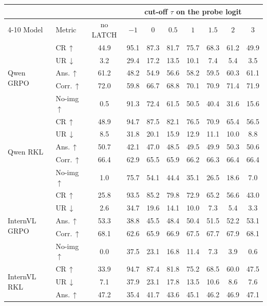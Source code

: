 \begin{table}[t]
\centering\small
\setlength{\tabcolsep}{4pt}
\begin{tabular}{llcccccccc}
\toprule
& & & \multicolumn{7}{c}{cut-off $\tau$ on the probe logit} \\ \cmidrule(lr){4-10}
Model & Metric & no LATCH & $-1$ & $0$ & $0.5$ & $1$ & $1.5$ & $2$ & $3$ \\
\midrule
\multirow{5}{*}{Qwen GRPO} & CR\,$\uparrow$ & 44.9 & 95.1 & 87.3 & 81.7 & 75.7 & 68.3 & 61.2 & 49.9 \\
 & UR\,$\downarrow$ & 3.2 & 29.4 & 17.2 & 13.5 & 10.1 & 7.4 & 5.4 & 3.5 \\
 & Ans.\,$\uparrow$ & 61.2 & 48.2 & 54.9 & 56.6 & 58.2 & 59.5 & 60.3 & 61.1 \\
 & Corr.\,$\uparrow$ & 72.0 & 59.8 & 66.7 & 68.8 & 70.1 & 70.9 & 71.4 & 71.9 \\
 & No-img\,$\uparrow$ & 0.5 & 91.3 & 72.4 & 61.5 & 50.5 & 40.4 & 31.6 & 15.6 \\
\midrule
\multirow{5}{*}{Qwen RKL} & CR\,$\uparrow$ & 48.9 & 94.7 & 87.5 & 82.1 & 76.5 & 70.9 & 65.4 & 56.5 \\
 & UR\,$\downarrow$ & 8.5 & 31.8 & 20.1 & 15.9 & 12.9 & 11.1 & 10.0 & 8.8 \\
 & Ans.\,$\uparrow$ & 50.7 & 42.1 & 47.0 & 48.5 & 49.5 & 49.9 & 50.3 & 50.6 \\
 & Corr.\,$\uparrow$ & 66.4 & 62.9 & 65.5 & 65.9 & 66.2 & 66.3 & 66.4 & 66.4 \\
 & No-img\,$\uparrow$ & 1.0 & 75.7 & 54.1 & 44.4 & 35.1 & 26.5 & 18.6 & 7.0 \\
\midrule
\multirow{5}{*}{InternVL GRPO} & CR\,$\uparrow$ & 25.8 & 93.5 & 85.2 & 79.8 & 72.9 & 65.2 & 56.6 & 43.0 \\
 & UR\,$\downarrow$ & 2.6 & 34.7 & 19.6 & 14.1 & 10.0 & 7.3 & 5.4 & 3.3 \\
 & Ans.\,$\uparrow$ & 53.3 & 38.8 & 45.5 & 48.4 & 50.4 & 51.5 & 52.2 & 53.1 \\
 & Corr.\,$\uparrow$ & 68.1 & 62.6 & 65.9 & 66.9 & 67.5 & 67.7 & 67.9 & 68.1 \\
 & No-img\,$\uparrow$ & 0.0 & 37.5 & 23.1 & 16.8 & 11.4 & 7.3 & 3.9 & 0.6 \\
\midrule
\multirow{5}{*}{InternVL RKL} & CR\,$\uparrow$ & 33.9 & 94.7 & 87.4 & 81.8 & 75.2 & 68.5 & 60.0 & 47.5 \\
 & UR\,$\downarrow$ & 7.1 & 37.9 & 23.1 & 17.8 & 13.5 & 10.6 & 8.6 & 7.6 \\
 & Ans.\,$\uparrow$ & 47.2 & 35.4 & 41.7 & 43.6 & 45.1 & 46.2 & 46.9 & 47.1 \\

\end{tabular}
\end{table}
